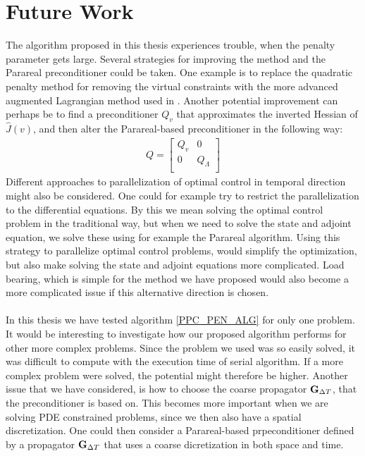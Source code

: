 \section{Future Work}
The algorithm proposed in this thesis experiences trouble, when the penalty parameter gets large. Several strategies for improving the method and the Parareal preconditioner could be taken. One example is to replace the quadratic penalty method for removing the virtual constraints with the more advanced augmented Lagrangian method used in \cite{rao2016time}. Another potential improvement can perhaps be to find a preconditioner $Q_v$ that approximates the inverted Hessian of $\hat J(v)$, and then alter the Parareal-based preconditioner in the following way:
\begin{align*}
Q = \left[ \begin{array}{cc}
	Q_v & 0 \\
	0 & Q_{\Lambda} \\
	\end{array} \right]
\end{align*}
Different approaches to parallelization of optimal control in temporal direction might also be considered. One could for example try to restrict the parallelization to the differential equations. By this we mean solving the optimal control problem in the traditional way, but when we need to solve the state and adjoint equation, we solve these using for example the Parareal algorithm. Using this strategy to parallelize optimal control problems, would simplify the optimization, but also make solving the state and adjoint equations more complicated. Load bearing, which is simple for the method we have proposed would also become a more complicated issue if this alternative direction is chosen.
\\
\\
In this thesis we have tested algorithm \ref{PPC_PEN_ALG} for only one problem. It would be interesting to investigate how our proposed algorithm performs for other more complex problems. Since the problem we used was so easily solved, it was difficult to compute with the execution time of serial algorithm. If a more complex problem were solved, the potential might therefore be higher. Another issue that we have considered, is how to choose the coarse propagator $\bold G_{\Delta T}$, that the preconditioner is based on. This becomes more important when we are solving PDE constrained problems, since we then also have a spatial discretization. One could then consider a Parareal-based prpeconditioner defined by a propagator $\bold G_{\Delta T}$  that uses a coarse dicretization in both space and time.



